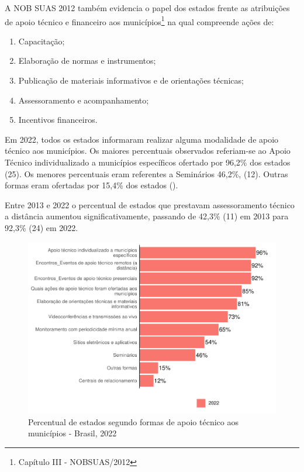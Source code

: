 \documentclass[
  brazilian]{report}
\providecommand{\tightlist}{%
  \setlength{\itemsep}{0pt}\setlength{\parskip}{0pt}}
\begin{document}
A NOB SUAS 2012 também evidencia o papel dos estados frente as
atribuições de apoio técnico e financeiro aos
municípios\footnote{Capítulo III - NOBSUAS/2012} na qual compreende
ações de:

\begin{enumerate}
\def\labelenumi{\Roman{enumi})}
\tightlist
\item
  Capacitação;
\item
  Elaboração de normas e instrumentos;
\item
  Publicação de materiais informativos e de orientações técnicas;
\item
  Assessoramento e acompanhamento;
\item
  Incentivos financeiros.
\end{enumerate}

Em 2022, todos os estados informaram realizar alguma modalidade de apoio
técnico aos municípios. Os maiores percentuais observados referiam-se ao
Apoio Técnico individualizado a municípios específicos ofertado por
96,2\% dos estados (25). Os menores percentuais eram referentes a
Seminários 46,2\%, (12). Outras formas eram ofertadas por 15,4\% dos
estados ().

Entre 2013 e 2022 o percentual de estados que prestavam assessoramento
técnico a distância aumentou significativamente, passando de 42,3\% (11)
em 2013 para 92,3\% (24) em 2022.

\begin{figure}
\includegraphics{Censo-SUAS-2022_files/figure-latex/estados-formas-apoio-1} \caption[Percentual de estados segundo formas de apoio técnico aos municípios - Brasil, 2022]{Percentual de estados segundo formas de apoio técnico aos municípios - Brasil, 2022}\label{fig:estados-formas-apoio}
\end{figure}
\end{document}

